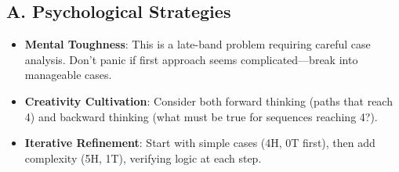 \documentclass[]{article}
\begin{document}
\begin{strategicbox}
\subsection*{A. Psychological Strategies}
\begin{itemize}[leftmargin=*]
    \item \textbf{Mental Toughness}: This is a late-band problem requiring careful case analysis. Don't panic if first approach seems complicated—break into manageable cases.
    \item \textbf{Creativity Cultivation}: Consider both forward thinking (paths that reach 4) and backward thinking (what must be true for sequences reaching 4?).
    \item \textbf{Iterative Refinement}: Start with simple cases (4H, 0T first), then add complexity (5H, 1T), verifying logic at each step.
\end{itemize}


\end{strategicbox}
\end{document}

